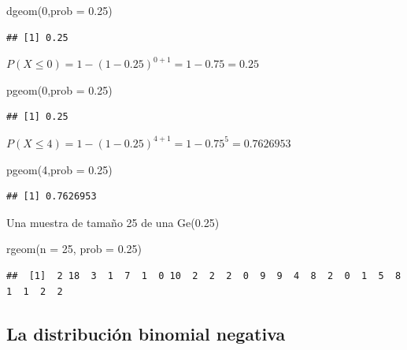 \documentclass[
]{article}
\newenvironment{Shaded}{\begin{snugshade}}{\end{snugshade}}
\newcommand{\AttributeTok}[1]{\textcolor[rgb]{0.77,0.63,0.00}{#1}}
\newcommand{\DecValTok}[1]{\textcolor[rgb]{0.00,0.00,0.81}{#1}}
\newcommand{\FloatTok}[1]{\textcolor[rgb]{0.00,0.00,0.81}{#1}}
\newcommand{\FunctionTok}[1]{\textcolor[rgb]{0.00,0.00,0.00}{#1}}
\newcommand{\NormalTok}[1]{#1}
\begin{document}
\begin{Shaded}
\begin{Highlighting}[]
\FunctionTok{dgeom}\NormalTok{(}\DecValTok{0}\NormalTok{,}\AttributeTok{prob =} \FloatTok{0.25}\NormalTok{)}
\end{Highlighting}
\end{Shaded}

\begin{verbatim}
## [1] 0.25
\end{verbatim}

\(P(X\leq 0) = 1-(1-0.25)^{0+1} = 1 - 0.75 = 0.25\)

\begin{Shaded}
\begin{Highlighting}[]
\FunctionTok{pgeom}\NormalTok{(}\DecValTok{0}\NormalTok{,}\AttributeTok{prob =} \FloatTok{0.25}\NormalTok{)}
\end{Highlighting}
\end{Shaded}

\begin{verbatim}
## [1] 0.25
\end{verbatim}

\(P(X\leq 4) = 1-(1-0.25)^{4+1} = 1-0.75^5 = 0.7626953\)

\begin{Shaded}
\begin{Highlighting}[]
\FunctionTok{pgeom}\NormalTok{(}\DecValTok{4}\NormalTok{,}\AttributeTok{prob =} \FloatTok{0.25}\NormalTok{)}
\end{Highlighting}
\end{Shaded}

\begin{verbatim}
## [1] 0.7626953
\end{verbatim}

Una muestra de tamaño 25 de una Ge(0.25)

\begin{Shaded}
\begin{Highlighting}[]
\FunctionTok{rgeom}\NormalTok{(}\AttributeTok{n =} \DecValTok{25}\NormalTok{, }\AttributeTok{prob =} \FloatTok{0.25}\NormalTok{)}
\end{Highlighting}
\end{Shaded}

\begin{verbatim}
##  [1]  2 18  3  1  7  1  0 10  2  2  2  0  9  9  4  8  2  0  1  5  8  1  1  2  2
\end{verbatim}

\hypertarget{la-distribuciuxf3n-binomial-negativa}{%
\subsection{La distribución binomial
negativa}\label{la-distribuciuxf3n-binomial-negativa}}
\end{document}
